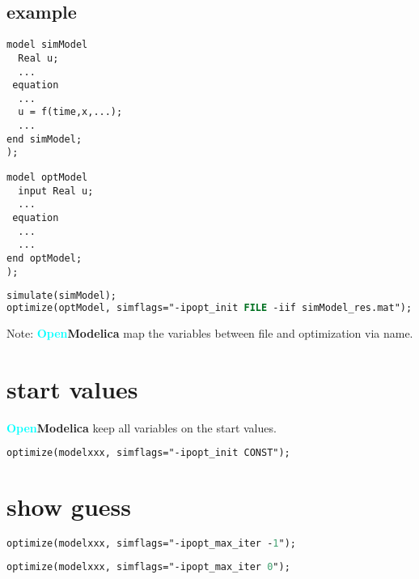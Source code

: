 \documentclass[12pt, a4paper]{article}
\newcommand{\OpenModelica}[0]{
\textcolor{cyan}{\textbf{Open}}\textbf{Modelica}}
\begin{document}
\subsection{example}

\begin{lstlisting}[language=Modelica, caption={model for initial guess},frame=single]
model simModel
  Real u;
  ...
 equation
  ...
  u = f(time,x,...);
  ...
end simModel;
);
\end{lstlisting}
\begin{lstlisting}[language=Modelica, caption={model for optimization},frame=single]
model optModel
  input Real u;
  ...
 equation
  ...
  ...
end optModel;
);
\end{lstlisting}

\begin{lstlisting}[language=Pascal, caption={initial guess with file},frame=single]
simulate(simModel);
optimize(optModel, simflags="-ipopt_init FILE -iif simModel_res.mat");
\end{lstlisting}

Note: \OpenModelica{} map the variables between file and optimization via name.

\section{start values}
\OpenModelica{} keep all variables on the start values.
\begin{lstlisting}[language=Pascal, caption={start values},frame=single]
optimize(modelxxx, simflags="-ipopt_init CONST");
\end{lstlisting}

\section{show guess}

\begin{lstlisting}[language=Pascal, caption={result with intial guess},frame=single]
optimize(modelxxx, simflags="-ipopt_max_iter -1");
\end{lstlisting}

\begin{lstlisting}[language=Pascal, caption={result with intial guess after preprocessing},frame=single]
optimize(modelxxx, simflags="-ipopt_max_iter 0");
\end{lstlisting}
\end{document}

